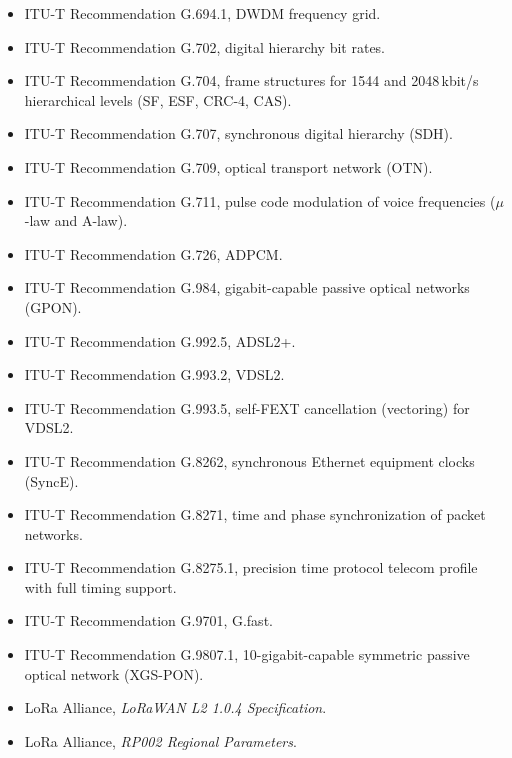 \begin{itemize}[leftmargin=1.5em,itemindent=-1.5em,itemsep=1.5pt plus 1pt,parsep=0pt,topsep=4pt,label={}]
\item ITU-T Recommendation G.694.1, DWDM frequency grid.
\item ITU-T Recommendation G.702, digital hierarchy bit rates.
\item ITU-T Recommendation G.704, frame structures for 1544 and 2048\,kbit/s hierarchical levels (SF, ESF, CRC-4, CAS).
\item ITU-T Recommendation G.707, synchronous digital hierarchy (SDH).
\item ITU-T Recommendation G.709, optical transport network (OTN).
\item ITU-T Recommendation G.711, pulse code modulation of voice frequencies ($\mu$-law and A-law).
\item ITU-T Recommendation G.726, ADPCM.
\item ITU-T Recommendation G.984, gigabit-capable passive optical networks (GPON).
\item ITU-T Recommendation G.992.5, ADSL2+.
\item ITU-T Recommendation G.993.2, VDSL2.
\item ITU-T Recommendation G.993.5, self-FEXT cancellation (vectoring) for VDSL2.
\item ITU-T Recommendation G.8262, synchronous Ethernet equipment clocks (SyncE).
\item ITU-T Recommendation G.8271, time and phase synchronization of packet networks.
\item ITU-T Recommendation G.8275.1, precision time protocol telecom profile with full timing support.
\item ITU-T Recommendation G.9701, G.fast.
\item ITU-T Recommendation G.9807.1, 10-gigabit-capable symmetric passive optical network (\mbox{XGS-PON}).
\item LoRa Alliance, \emph{LoRaWAN L2 1.0.4 Specification}.
\item LoRa Alliance, \emph{RP002 Regional Parameters}.

\end{itemize}
